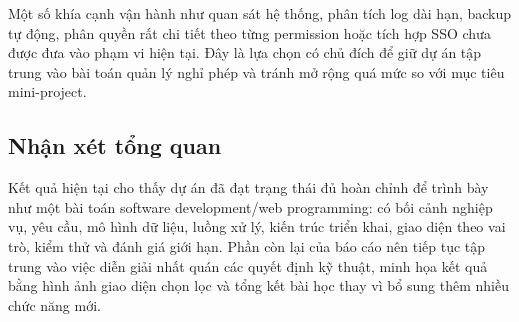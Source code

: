 Một số khía cạnh vận hành như quan sát hệ thống, phân tích log dài hạn, backup tự động, phân quyền rất chi tiết theo từng permission hoặc tích hợp SSO chưa được đưa vào phạm vi hiện tại. Đây là lựa chọn có chủ đích để giữ dự án tập trung vào bài toán quản lý nghỉ phép và tránh mở rộng quá mức so với mục tiêu mini-project.

\subsection{Nhận xét tổng quan}
Kết quả hiện tại cho thấy dự án đã đạt trạng thái đủ hoàn chỉnh để trình bày như một bài toán software development/web programming: có bối cảnh nghiệp vụ, yêu cầu, mô hình dữ liệu, luồng xử lý, kiến trúc triển khai, giao diện theo vai trò, kiểm thử và đánh giá giới hạn. Phần còn lại của báo cáo nên tiếp tục tập trung vào việc diễn giải nhất quán các quyết định kỹ thuật, minh họa kết quả bằng hình ảnh giao diện chọn lọc và tổng kết bài học thay vì bổ sung thêm nhiều chức năng mới.
